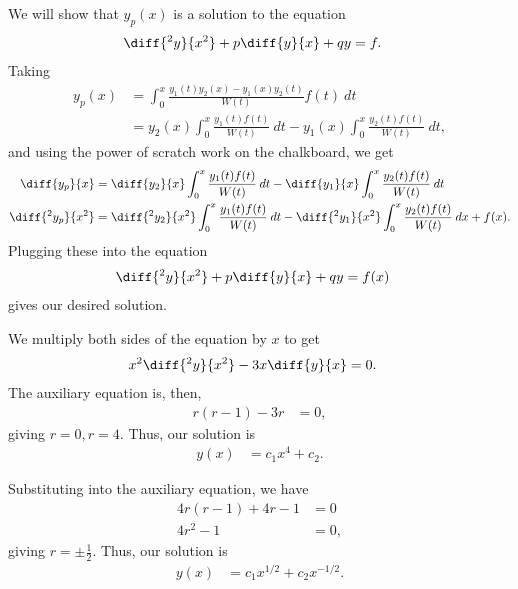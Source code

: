 \documentclass[12pt]{mypackage}
\begin{document}
\begin{solution}[4.6, Problem 31]
  We will show that $y_p(x)$ is a solution to the equation
  \begin{align*}
    \diff{^2y}{x^2} + p\diff{y}{x} + qy &= f.
  \end{align*}
  Taking
  \begin{align*}
    y_p(x) &= \int_{0}^{x} \frac{y_1(t)y_2(x) - y_1(x)y_2(t)}{W(t)}f(t)\:dt\\
           &= y_2(x)\int_{0}^{x} \frac{y_1(t)f(t)}{W(t)}\:dt - y_1(x)\int_{0}^{x} \frac{y_2(t)f(t)}{W(t)}\:dt,
  \end{align*}
  and using the power of scratch work on the chalkboard, we get 
  \begin{align*}
    \diff{y_p}{x} &= \diff{y_2}{x}\int_{0}^{x} \frac{y_1(t)f(t)}{W(t)}\:dt - \diff{y_1}{x} \int_{0}^{x} \frac{y_2(t)f(t)}{W(t)}\:dt\\
    \diff{^2y_p}{x^2} &= \diff{^2y_2}{x^2}\int_{0}^{x} \frac{y_1(t)f(t)}{W(t)}\:dt - \diff{^2y_1}{x^2}\int_{0}^{x} \frac{y_2(t)f(t)}{W(t)}\:dx + f(x).
  \end{align*}
  Plugging these into the equation
  \begin{align*}
    \diff{^2y}{x^2} + p\diff{y}{x} + qy &= f(x)
  \end{align*}
  gives our desired solution.
\end{solution}
\begin{solution}[4.7, Problem 4]
  We multiply both sides of the equation by $x$ to get
  \begin{align*}
    x^2 \diff{^2y}{x^2} - 3x\diff{y}{x} &= 0.
  \end{align*}
  The auxiliary equation is, then,
  \begin{align*}
    r\left( r-1 \right) - 3r &= 0,
  \end{align*}
  giving $r = 0,r=4$. Thus, our solution is
  \begin{align*}
    y(x) &= c_1 x^{4} + c_2.
  \end{align*}
\end{solution}
\begin{solution}[4.7, Problem 10]
  Substituting into the auxiliary equation, we have
  \begin{align*}
    4r\left( r-1 \right) + 4r - 1 &= 0\\
    4r^2 - 1 &= 0,
  \end{align*}
  giving $r = \pm \frac{1}{2}$. Thus, our solution is
  \begin{align*}
    y(x) &= c_1x^{1/2} + c_2x^{-1/2}.
  \end{align*}
\end{solution}
\end{document}
